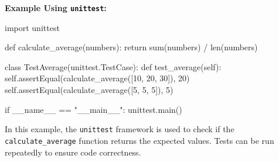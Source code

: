 \documentclass[
  letterpaper,
  DIV=11,
  numbers=noendperiod]{scrreprt}
\newenvironment{Shaded}{\begin{snugshade}}{\end{snugshade}}
\newcommand{\BuiltInTok}[1]{\textcolor[rgb]{0.00,0.23,0.31}{#1}}
\newcommand{\ControlFlowTok}[1]{\textcolor[rgb]{0.00,0.23,0.31}{#1}}
\newcommand{\DecValTok}[1]{\textcolor[rgb]{0.68,0.00,0.00}{#1}}
\newcommand{\ImportTok}[1]{\textcolor[rgb]{0.00,0.46,0.62}{#1}}
\newcommand{\KeywordTok}[1]{\textcolor[rgb]{0.00,0.23,0.31}{#1}}
\newcommand{\NormalTok}[1]{\textcolor[rgb]{0.00,0.23,0.31}{#1}}
\newcommand{\OperatorTok}[1]{\textcolor[rgb]{0.37,0.37,0.37}{#1}}
\newcommand{\StringTok}[1]{\textcolor[rgb]{0.13,0.47,0.30}{#1}}
\newcommand{\VariableTok}[1]{\textcolor[rgb]{0.07,0.07,0.07}{#1}}
\begin{document}
\textbf{Example Using \texttt{unittest}:}

\begin{Shaded}
\begin{Highlighting}[]
\ImportTok{import}\NormalTok{ unittest}

\KeywordTok{def}\NormalTok{ calculate\_average(numbers):}
    \ControlFlowTok{return} \BuiltInTok{sum}\NormalTok{(numbers) }\OperatorTok{/} \BuiltInTok{len}\NormalTok{(numbers)}

\KeywordTok{class}\NormalTok{ TestAverage(unittest.TestCase):}
    \KeywordTok{def}\NormalTok{ test\_average(}\VariableTok{self}\NormalTok{):}
        \VariableTok{self}\NormalTok{.assertEqual(calculate\_average([}\DecValTok{10}\NormalTok{, }\DecValTok{20}\NormalTok{, }\DecValTok{30}\NormalTok{]), }\DecValTok{20}\NormalTok{)}
        \VariableTok{self}\NormalTok{.assertEqual(calculate\_average([}\DecValTok{5}\NormalTok{, }\DecValTok{5}\NormalTok{, }\DecValTok{5}\NormalTok{]), }\DecValTok{5}\NormalTok{)}

\ControlFlowTok{if} \VariableTok{\_\_name\_\_} \OperatorTok{==} \StringTok{"\_\_main\_\_"}\NormalTok{:}
\NormalTok{    unittest.main()}
\end{Highlighting}
\end{Shaded}

In this example, the \texttt{unittest} framework is used to check if the
\texttt{calculate\_average} function returns the expected values. Tests
can be run repeatedly to ensure code correctness.
\end{document}
